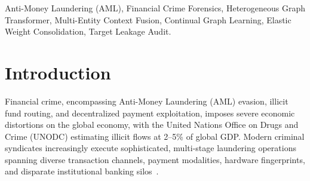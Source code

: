 \documentclass[conference]{IEEEtran}
\begin{document}
\begin{IEEEkeywords}
Anti-Money Laundering (AML), Financial Crime Forensics, Heterogeneous Graph Transformer, Multi-Entity Context Fusion, Continual Graph Learning, Elastic Weight Consolidation, Target Leakage Audit.
\end{IEEEkeywords}

\section{Introduction}
\label{sec:intro}

Financial crime, encompassing Anti-Money Laundering (AML) evasion, illicit fund routing, and decentralized payment exploitation, imposes severe economic distortions on the global economy, with the United Nations Office on Drugs and Crime (UNODC) estimating illicit flows at 2--5\% of global GDP. Modern criminal syndicates increasingly execute sophisticated, multi-stage laundering operations spanning diverse transaction channels, payment modalities, hardware fingerprints, and disparate institutional banking silos~\cite{weber2019anti}. 
\end{document}
